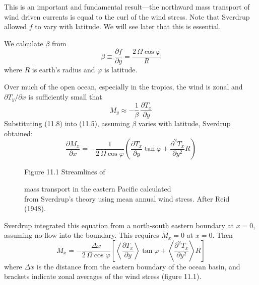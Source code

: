 This is an important and fundamental result---the northward mass
transport of wind driven currents is equal to the curl of the wind
stress. Note that Sverdrup allowed $f$ to vary with latitude. We will see later that this is
essential.

We calculate $\beta $ from
\begin{equation}
\beta \equiv \frac{\partial{f}}{\partial{y}} = \frac{2\,\Omega\cos\varphi}{R}
\end{equation}
where $R$ is earth's radius and $\varphi$ is latitude.

Over much of the open ocean, especially in the tropics, the wind is zonal and
$\partial{T_y}/\partial{x}$ is sufficiently small that
\begin{equation}
M_y \approx -\frac{1}{\beta}\,\frac{\partial T_x}{\partial y}
\end{equation}
Substituting (11.8) into (11.5), assuming $\beta$ varies with latitude, Sverdrup obtained:
\begin{equation}
\frac{\partial{M_x}}{\partial{x}}=-
\frac{1}{2\,\Omega\cos\varphi}\left(\frac{\partial{T_x}}{\partial{y}}\tan\varphi +
\frac{\partial^2{T_x}}{\partial{y}^2}R \right)
\end{equation}


\begin{figure}[t!]
\centering
\footnotesize
Figure 11.1  Streamlines of \rule{0mm}{3ex}mass transport in the
eastern Pacific calculated\\from Sverdrup's theory using mean annual wind stress. After Reid (1948).

\label{fig:sverdrupmap}
\vspace{-3ex}
\end{figure}

Sverdrup integrated this equation from a north-south eastern boundary at $ x =
0$, assuming no flow into the boundary. This requires $M_x = 0$ at $x = 0$. Then
\begin{equation}
M_x =- \frac{\Delta{x}}{2\,\Omega\cos\varphi}\left[ \left<
\frac{\partial{T_x}}{\partial{y}}\right > \tan\varphi +
\left< \frac{\partial^2{T_x}}{\partial{y}^2} \right> R \right]
\end{equation}
where $\Delta x$ is the distance from the eastern boundary of the ocean basin,
and brackets indicate zonal averages of the wind stress
(figure 11.1).

